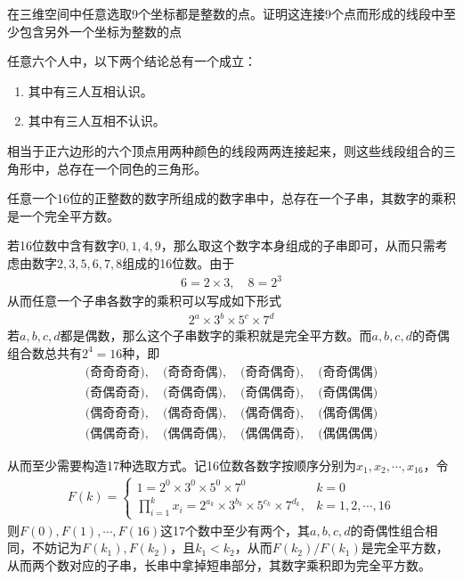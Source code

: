 \begin{question}
  在三维空间中任意选取9个坐标都是整数的点。证明这连接9个点而形成的线段中至少包含另外一个坐标为整数的点
\end{question}

\begin{question}
  任意六个人中，以下两个结论总有一个成立：
  \begin{enumerate}
  \item 其中有三人互相认识。
  \item 其中有三人互相不认识。
  \end{enumerate}
\end{question}

\hints 相当于正六边形的六个顶点用两种颜色的线段两两连接起来，则这些线段组合的三角形中，总存在一个同色的三角形。

\begin{question}
  任意一个16位的正整数的数字所组成的数字串中，总存在一个子串，其数字的乘积是一个完全平方数。
\end{question}

\hints 若16位数中含有数字$0,1,4,9$，那么取这个数字本身组成的子串即可，从而只需考虑由数字$2,3,5,6,7,8$组成的16位数。由于
\begin{align*}
  6 = 2\times 3,\quad 8=2^3
\end{align*}
从而任意一个子串各数字的乘积可以写成如下形式
\begin{align*}
  2^a \times 3^b \times 5^c \times 7^d
\end{align*}
若$a,b,c,d$都是偶数，那么这个子串数字的乘积就是完全平方数。而$a,b,c,d$的奇偶组合数总共有$2^4=16$种，即
\begin{align*}
  \text{(奇奇奇奇)},\quad \text{(奇奇奇偶)},\quad \text{(奇奇偶奇)},\quad \text{(奇奇偶偶)}\\
  \text{(奇偶奇奇)},\quad \text{(奇偶奇偶)},\quad \text{(奇偶偶奇)},\quad \text{(奇偶偶偶)}\\
  \text{(偶奇奇奇)},\quad \text{(偶奇奇偶)},\quad \text{(偶奇偶奇)},\quad \text{(偶奇偶偶)}\\
  \text{(偶偶奇奇)},\quad \text{(偶偶奇偶)},\quad \text{(偶偶偶奇)},\quad \text{(偶偶偶偶)}
\end{align*}

从而至少需要构造17种选取方式。记16位数各数字按顺序分别为$x_1,x_2,\cdots,x_{16}$，令
\begin{align*}
  F(k) =
  \begin{cases}
    1 = 2^0 \times 3^0 \times 5^0 \times 7^0 & k=0\\
    \prod_{i=1}^k x_i = 2^{a_k} \times 3^{b_k} \times 5^{c_k} \times 7^{d_k},&k=1,2,\cdots,16
  \end{cases}
\end{align*}
则$F(0),F(1),\cdots,F(16)$这17个数中至少有两个，其$a,b,c,d$的奇偶性组合相同，不妨记为$F(k_1),F(k_2)$，且$k_1<k_2$，从而$F(k_2)/F(k_1)$是完全平方数，从而两个数对应的子串，长串中拿掉短串部分，其数字乘积即为完全平方数。
